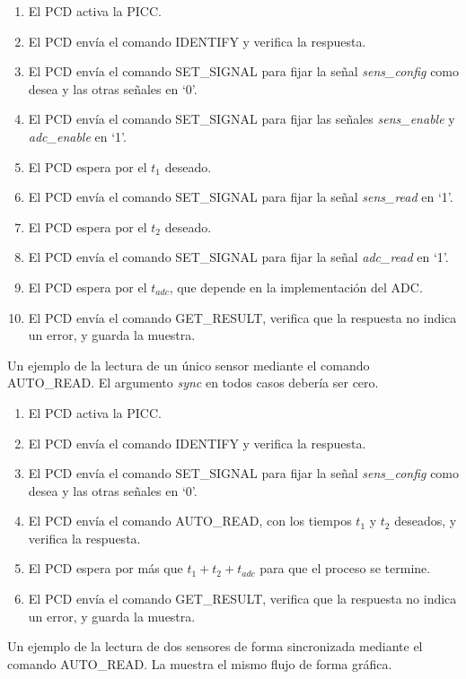 \documentclass[a4paper, twoside, 11pt]{report}
\begin{document}
\begin{enumerate}
  \item El PCD activa la PICC.
  \item El PCD envía el comando IDENTIFY y verifica la respuesta.
  \item El PCD envía el comando SET\_SIGNAL para fijar la señal \textit{sens\_config} como desea y las otras señales en ‘0’.
  \item El PCD envía el comando SET\_SIGNAL para fijar las señales \textit{sens\_enable} y \textit{adc\_enable} en ‘1’.
  \item El PCD espera por el $t_1$ deseado.
  \item El PCD envía el comando SET\_SIGNAL para fijar la señal \textit{sens\_read} en ‘1’.
  \item El PCD espera por el $t_2$ deseado.
  \item El PCD envía el comando SET\_SIGNAL para fijar la señal \textit{adc\_read} en ‘1’.
  \item El PCD espera por el $t_{adc}$, que depende en la implementación del ADC.
  \item El PCD envía el comando GET\_RESULT, verifica que la respuesta no indica un error, y guarda la muestra.
\end{enumerate}

Un ejemplo de la lectura de un único sensor mediante el comando AUTO\_READ. El argumento \textit{sync} en todos casos debería ser cero.

\begin{enumerate}
  \item El PCD activa la PICC.
  \item El PCD envía el comando IDENTIFY y verifica la respuesta.
  \item El PCD envía el comando SET\_SIGNAL para fijar la señal \textit{sens\_config} como desea y las otras señales en ‘0’.
  \item El PCD envía el comando AUTO\_READ, con los tiempos $t_1$ y $t_2$ deseados, y verifica la respuesta.
  \item El PCD espera por más que $t_1 + t_2 + t_{adc}$ para que el proceso se termine.
  \item El PCD envía el comando GET\_RESULT, verifica que la respuesta no indica un error, y guarda la muestra. 
\end{enumerate}

Un ejemplo de la lectura de dos sensores de forma sincronizada mediante el comando AUTO\_READ. La  muestra el mismo flujo de forma gráfica.
\end{document}

